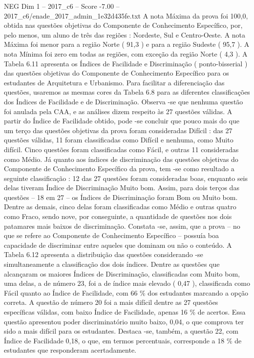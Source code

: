 \begin{textsample}{NEG Dim 1 – 2017\_c6 – Score -7.00 – 2017\_c6/enade\_2017\_admin\_1e32d435fe.txt}
A nota Máxima da prova foi 100,0, obtida nas questões objetivas do Componente de Conhecimento Específico, por, pelo menos, um aluno de três das regiões : Nordeste, Sul e Centro-Oeste.
A nota Máxima foi menor para a região Norte ( 91,3 ) e para a região Sudeste ( 95,7 ).
A nota Mínima foi zero em todas as regiões, com exceção da região Norte ( 4,3 ).
A Tabela 6.11 apresenta os Índices de Facilidade e Discriminação ( ponto-bisserial ) das questões objetivas do Componente de Conhecimento Específico para os estudantes de Arquitetura e Urbanismo.
Para facilitar a diferenciação das questões, usaremos as mesmas cores da Tabela 6.8 para as diferentes classificações dos Índices de Facilidade e de Discriminação.
Observa -se que nenhuma questão foi anulada pela CAA, e as análises dizem respeito às 27 questões válidas.
A partir do Índice de Facilidade obtido, pode -se concluir que pouco mais do que um terço das questões objetivas da prova foram consideradas Difícil : das 27 questões válidas, 11 foram classificadas como Difícil e nenhuma, como Muito difícil.
Cinco questões foram classificadas como Fácil, e outras 11 consideradas como Médio.
Já quanto aos índices de discriminação das questões objetivas do Componente de Conhecimento Específico da prova, tem -se como resultado a seguinte classificação : 12 das 27 questões foram consideradas boas, enquanto seis delas tiveram Índice de Discriminação Muito bom.
Assim, para dois terços das questões – 18 em 27 – os Índices de Discriminação foram Bom ou Muito bom.
Dentre as demais, cinco delas foram classificadas como Médio e outras quatro como Fraco, sendo nove, por conseguinte, a quantidade de questões nos dois patamares mais baixos de discriminação.
Constata -se, assim, que a prova – no que se refere ao Componente de Conhecimento Específico – possuía boa capacidade de discriminar entre aqueles que dominam ou não o conteúdo.
A Tabela 6.12 apresenta a distribuição das questões considerando -se simultaneamente a classificação dos dois índices.
Dentre as questões que alcançaram os maiores Índices de Discriminação, classificadas com Muito bom, uma delas, a de número 23, foi a de índice mais elevado ( 0,47 ), classificada como Fácil quanto ao Índice de Facilidade, com 66 \% dos estudantes marcando a opção correta.
A questão de número 20 foi a mais difícil dentre as 27 questões específicas válidas, com baixo Índice de Facilidade, apenas 16 \% de acertos.
Essa questão apresentou poder discriminatório muito baixo, 0,04, o que comprova ter sido a mais difícil para os estudantes.
Destaca -se, também, a questão 22, com Índice de Facilidade 0,18, o que, em termos percentuais, corresponde a 18 \% de estudantes que responderam acertadamente.

\end{textsample}
